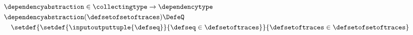 \begin{align*}
    &\dependencyabstraction \in \collectingtype \to \dependencytype \\
    &\dependencyabstraction(\defsetofsetoftraces) \DefeQ \\
    &\quad \setdef{
      \setdef{\inputoutputtuple{\defseq}}{\defseq\in\defsetoftraces}
    }{
      \defsetoftraces\in\defsetofsetoftraces
    }
  \end{align*}
